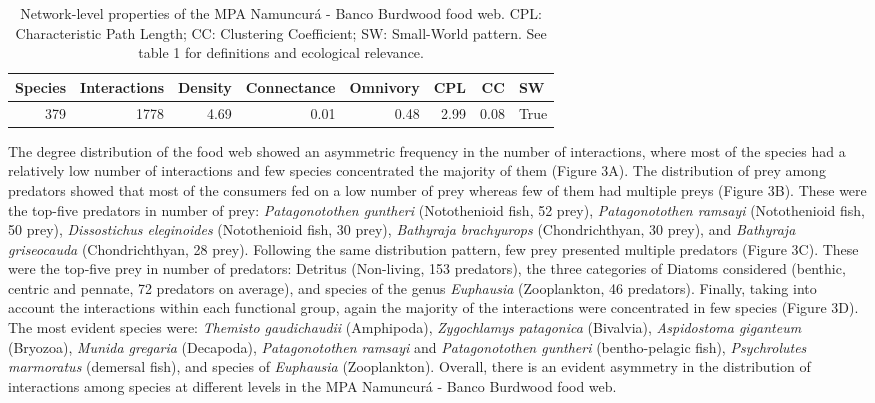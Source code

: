 \documentclass[preprint, 3p,
authoryear]{elsarticle} %
\begin{document}
\begin{table}

\caption{\label{tab:table2}Network-level properties of the MPA Namuncurá - Banco Burdwood food web. CPL: Characteristic Path Length; CC: Clustering Coefficient; SW: Small-World pattern. See table 1 for definitions and ecological relevance.}
\centering
\begin{tabular}[t]{r|r|r|r|r|r|r|l}
\hline
\textbf{Species} & \textbf{Interactions} & \textbf{Density} & \textbf{Connectance} & \textbf{Omnivory} & \textbf{CPL} & \textbf{CC} & \textbf{SW}\\
\hline
379 & 1778 & 4.69 & 0.01 & 0.48 & 2.99 & 0.08 & True\\
\hline
\end{tabular}
\end{table}

The degree distribution of the food web showed an asymmetric frequency
in the number of interactions, where most of the species had a
relatively low number of interactions and few species concentrated the
majority of them (Figure 3A). The distribution of prey among predators
showed that most of the consumers fed on a low number of prey whereas
few of them had multiple preys (Figure 3B). These were the top-five
predators in number of prey: \emph{Patagonotothen guntheri}
(Notothenioid fish, 52 prey), \emph{Patagonotothen ramsayi}
(Notothenioid fish, 50 prey), \emph{Dissostichus eleginoides}
(Notothenioid fish, 30 prey), \emph{Bathyraja brachyurops}
(Chondrichthyan, 30 prey), and \emph{Bathyraja griseocauda}
(Chondrichthyan, 28 prey). Following the same distribution pattern, few
prey presented multiple predators (Figure 3C). These were the top-five
prey in number of predators: Detritus (Non-living, 153 predators), the
three categories of Diatoms considered (benthic, centric and pennate, 72
predators on average), and species of the genus \emph{Euphausia}
(Zooplankton, 46 predators). Finally, taking into account the
interactions within each functional group, again the majority of the
interactions were concentrated in few species (Figure 3D). The most
evident species were: \emph{Themisto gaudichaudii} (Amphipoda),
\emph{Zygochlamys patagonica} (Bivalvia), \emph{Aspidostoma giganteum}
(Bryozoa), \emph{Munida gregaria} (Decapoda), \emph{Patagonotothen
ramsayi} and \emph{Patagonotothen guntheri} (bentho-pelagic fish),
\emph{Psychrolutes marmoratus} (demersal fish), and species of
\emph{Euphausia} (Zooplankton). Overall, there is an evident asymmetry
in the distribution of interactions among species at different levels in
the MPA Namuncurá - Banco Burdwood food web.
\end{document}
